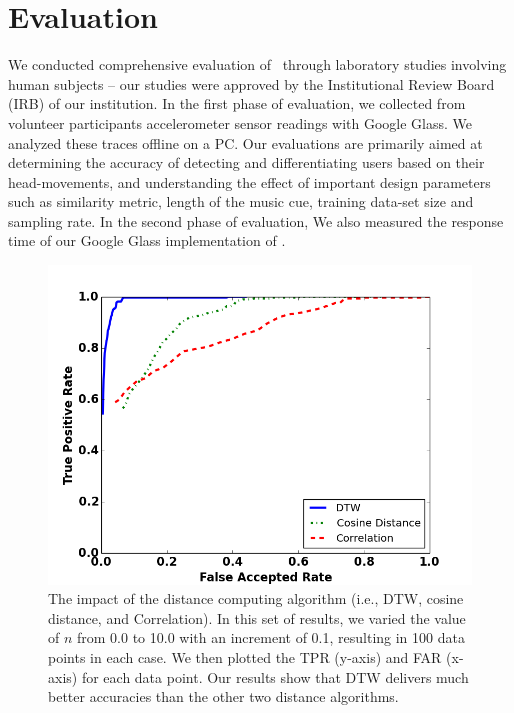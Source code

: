 \section{Evaluation}\label{sec:results}

We conducted comprehensive evaluation of \systemname~through laboratory studies involving
human subjects -- our studies were approved by the Institutional Review Board (IRB) of our
institution. In the first phase of evaluation, we collected from volunteer participants accelerometer sensor
readings with Google Glass. We analyzed these traces offline on a PC.
Our evaluations are primarily aimed at determining the accuracy of detecting
and differentiating users based on their head-movements, and understanding
the effect of important design parameters such as similarity metric, length of the music cue, training
data-set size and sampling rate. In the second phase of evaluation, We also measured the response time of our Google
Glass implementation of \systemname.


\begin{figure}
\includegraphics[width=\columnwidth]{figure/roc_dtw_cos_cor.png}
\caption{\label{fig:roc_dtw_cos_cor} The impact of the distance computing algorithm (i.e., DTW, cosine distance, and Correlation). In this set of results, we varied the value of $n$ from 0.0 to 10.0 with an increment of 0.1, resulting in 100 data points in each case. We then plotted the TPR (y-axis) and FAR (x-axis) for each data point. Our results show that DTW delivers much better accuracies than the other two distance algorithms.}
\end{figure}

